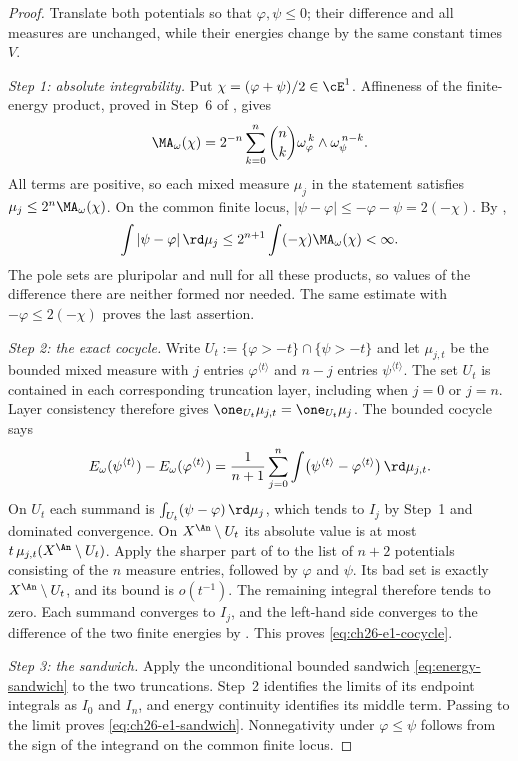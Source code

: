 \begin{proof}
Translate both potentials so that $\varphi,\psi\leq0$; their difference
and all measures are unchanged, while their energies change by the same
constant times $V$.

\emph{Step 1: absolute integrability.}  Put
$\chi=(\varphi+\psi)/2\in\cE^1$.  Affineness of the finite-energy
product, proved in Step~6 of , gives
\[
 \MA_\omega(\chi)
 =2^{-n}\sum_{k=0}^n\binom nk
       \omega_\varphi^{\,k}\wedge\omega_\psi^{\,n-k}.
\]
All terms are positive, so each mixed measure $\mu_j$ in the statement
satisfies $\mu_j\leq2^n\MA_\omega(\chi)$.
On the common finite locus,
$|\psi-\varphi|\leq-\varphi-\psi=2(-\chi)$.  By
,
\[
 \int|\psi-\varphi|\,\rd\mu_j
 \leq2^{n+1}\int(-\chi)\MA_\omega(\chi)<\infty.
\]
The pole sets are pluripolar and null for all these products, so values of
the difference there are neither formed nor needed.  The same estimate
with $-\varphi\leq2(-\chi)$ proves the last assertion.

\emph{Step 2: the exact cocycle.}  Write
$U_t:=\{\varphi>-t\}\cap\{\psi>-t\}$ and let $\mu_{j,t}$ be the
bounded mixed measure with $j$ entries $\varphi^{\langle t\rangle}$
and $n-j$ entries $\psi^{\langle t\rangle}$.  The set $U_t$ is
contained in each corresponding truncation layer, including when $j=0$
or $j=n$.  Layer consistency therefore gives
$\one_{U_t}\mu_{j,t}=\one_{U_t}\mu_j$.
The bounded cocycle says
\begin{equation}
\label{eq:ch26-truncated-cocycle}
 E_\omega(\psi^{\langle t\rangle})-E_\omega(\varphi^{\langle t\rangle})
 =\frac1{n+1}\sum_{j=0}^n
   \int\bigl(\psi^{\langle t\rangle}-\varphi^{\langle t\rangle}\bigr)
        \,\rd\mu_{j,t}.
\end{equation}
On $U_t$ each summand is
$\int_{U_t}(\psi-\varphi)\,\rd\mu_j$, which tends to $I_j$ by Step~1
and dominated convergence.  On $X^{\An}\setminus U_t$ its absolute
value is at most $t\,\mu_{j,t}(X^{\An}\setminus U_t)$.
Apply the sharper part of  to the list of
$n+2$ potentials consisting of the $n$ measure entries, followed by
$\varphi$ and $\psi$.  Its bad set is exactly
$X^{\An}\setminus U_t$, and its bound is $o(t^{-1})$.
The remaining integral therefore tends to zero.  Each summand converges
to $I_j$, and the left-hand side converges to the difference of the two
finite energies by .  This proves
\eqref{eq:ch26-e1-cocycle}.

\emph{Step 3: the sandwich.}  Apply the unconditional bounded sandwich
\eqref{eq:energy-sandwich} to the two truncations.  Step~2 identifies the
limits of its endpoint integrals as $I_0$ and $I_n$, and energy continuity
identifies its middle term.  Passing to the limit proves
\eqref{eq:ch26-e1-sandwich}.  Nonnegativity under $\varphi\leq\psi$
follows from the sign of the integrand on the common finite locus.
\end{proof}

